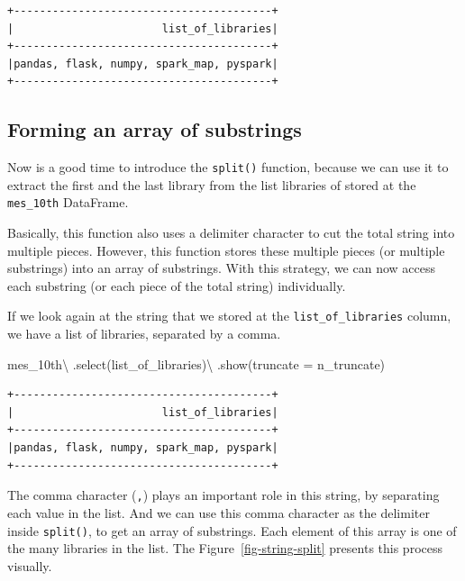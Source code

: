 \documentclass[
  11pt,
  letterpaper,
  DIV=11,
  numbers=noendperiod]{scrreprt}
\newenvironment{Shaded}{\begin{snugshade}}{\end{snugshade}}
\newcommand{\NormalTok}[1]{\textcolor[rgb]{0.00,0.23,0.31}{#1}}
\newcommand{\OperatorTok}[1]{\textcolor[rgb]{0.37,0.37,0.37}{#1}}
\newcommand{\StringTok}[1]{\textcolor[rgb]{0.13,0.47,0.30}{#1}}
\begin{document}
\begin{verbatim}
+----------------------------------------+
|                       list_of_libraries|
+----------------------------------------+
|pandas, flask, numpy, spark_map, pyspark|
+----------------------------------------+
\end{verbatim}

\subsection{Forming an array of
substrings}\label{forming-an-array-of-substrings}

Now is a good time to introduce the \texttt{split()} function, because
we can use it to extract the first and the last library from the list
libraries of stored at the \texttt{mes\_10th} DataFrame.

Basically, this function also uses a delimiter character to cut the
total string into multiple pieces. However, this function stores these
multiple pieces (or multiple substrings) into an array of substrings.
With this strategy, we can now access each substring (or each piece of
the total string) individually.

If we look again at the string that we stored at the
\texttt{list\_of\_libraries} column, we have a list of libraries,
separated by a comma.

\begin{Shaded}
\begin{Highlighting}[]
\NormalTok{mes\_10th}\OperatorTok{\textbackslash{}}
\NormalTok{    .select(}\StringTok{\textquotesingle{}list\_of\_libraries\textquotesingle{}}\NormalTok{)}\OperatorTok{\textbackslash{}}
\NormalTok{    .show(truncate }\OperatorTok{=}\NormalTok{ n\_truncate)}
\end{Highlighting}
\end{Shaded}

\begin{verbatim}
+----------------------------------------+
|                       list_of_libraries|
+----------------------------------------+
|pandas, flask, numpy, spark_map, pyspark|
+----------------------------------------+
\end{verbatim}

The comma character (\texttt{,}) plays an important role in this string,
by separating each value in the list. And we can use this comma
character as the delimiter inside \texttt{split()}, to get an array of
substrings. Each element of this array is one of the many libraries in
the list. The Figure~\ref{fig-string-split} presents this process
visually.
\end{document}
